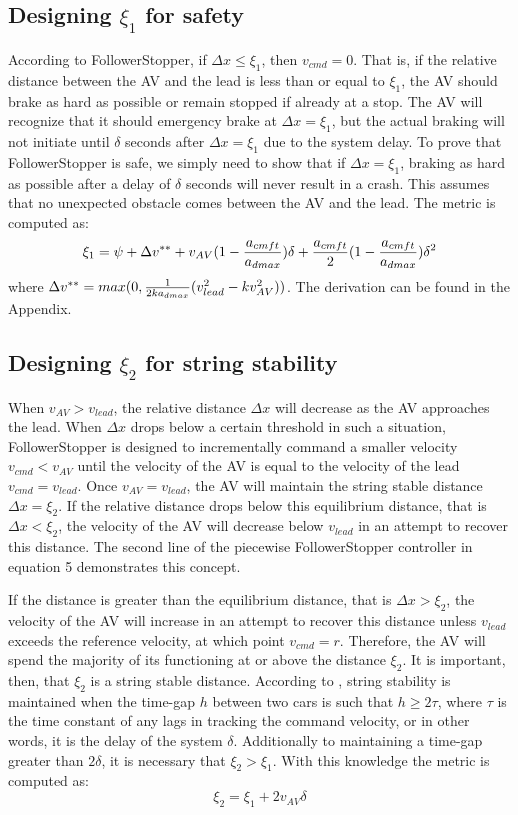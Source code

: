 \documentclass[conference]{IEEEtran}
\begin{document}
\subsection{Designing $\xi_1$ for safety}
According to FollowerStopper, if $\Delta x \leq \xi_1$, then $v_{cmd}=0$. That is, if the relative distance between the AV and the lead is less than or equal to $\xi_1$, the AV should brake as hard as possible or remain stopped if already at a stop. The AV will recognize that it should emergency brake at $\Delta x=\xi_1$, but the actual braking will not initiate until $\delta$ seconds after $\Delta x=\xi_1$ due to the system delay. To prove that FollowerStopper is safe, we simply need to show that if $\Delta x = \xi_1$, braking as hard as possible after a delay of $\delta$ seconds will never result in a crash. This assumes that no unexpected obstacle comes between the AV and the lead. The metric is computed as:
\begin{dmath}
\xi_1 = \psi +\Delta v^{**}+v_{AV}(1-{a_{cmft}\over a_{dmax}})\delta+{a_{cmft}\over 2}(1-{a_{cmft}\over a_{dmax}})\delta^2
\end{dmath}
where $\Delta v^{**} = max(0,{1\over 2ka_{dmax}}(v_{lead}^2-kv_{AV}^2))$. The derivation can be found in the Appendix.

\subsection{Designing $\xi_2$ for string stability}
When $v_{AV}>v_{lead}$, the relative distance $\Delta x$ will decrease as the AV approaches the lead. When $\Delta x$ drops below a certain threshold in such a situation, FollowerStopper is designed to incrementally command a smaller velocity $v_{cmd}<v_{AV}$ until the velocity of the AV is equal to the velocity of the lead $v_{cmd}=v_{lead}$. Once $v_{AV}=v_{lead}$, the AV will maintain the string stable distance $\Delta x=\xi_2$. If the relative distance drops below this equilibrium distance, that is $\Delta x<\xi_2$, the velocity of the AV will decrease below $v_{lead}$ in an attempt to recover this distance. The second line of the piecewise FollowerStopper controller in equation 5 demonstrates this concept.

 If the distance is greater than the equilibrium distance, that is $\Delta x>\xi_2$, the velocity of the AV will increase in an attempt to recover this distance unless $v_{lead}$ exceeds the reference velocity, at which point $v_{cmd}=r$. Therefore, the AV will spend the majority of its functioning at or above the distance $\xi_2$. It is important, then, that $\xi_2$ is a string stable distance. According to \cite{Rajamani}, string stability is maintained when the time-gap $h$ between two cars is such that $h\geq2\tau$, where $\tau$ is the time constant of any lags in tracking the command velocity, or in other words, it is the delay of the system $\delta$. Additionally to maintaining a time-gap greater than $2\delta$, it is necessary that $\xi_2>\xi_1$. With this knowledge the metric is computed as: 
 \begin{dmath}
 \xi_2 = \xi_1 + 2v_{AV}\delta
 \end{dmath}
\end{document}
